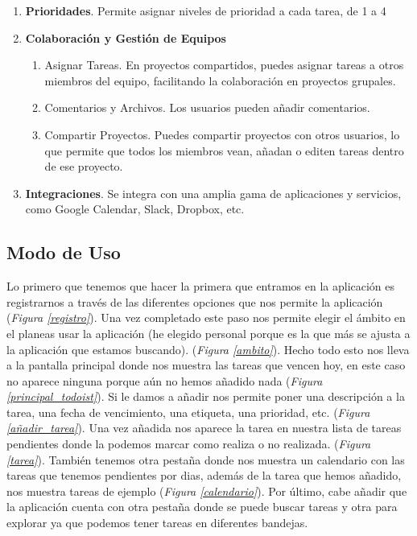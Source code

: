 \documentclass{article}
\begin{document}
\begin{enumerate}
\begin{enumerate}
        \item Filtros. Permite crear vistas personalizadas de las tareas, según criterios como fechas, etiquetas, etc.
    \end{enumerate}
    \item \textbf{Prioridades}. Permite asignar niveles de prioridad a cada tarea, de 1 a 4
    \item \textbf {Colaboración y Gestión de Equipos}
    \begin{enumerate}
        \item Asignar Tareas. En proyectos compartidos, puedes asignar tareas a otros miembros del equipo, facilitando la colaboración en proyectos grupales. 
        \item Comentarios y Archivos. Los usuarios pueden añadir comentarios.
        \item Compartir Proyectos. Puedes compartir proyectos con otros usuarios, lo que permite que todos los miembros vean, añadan o editen tareas dentro de ese proyecto.
    \end{enumerate}
    \item \textbf{Integraciones}. Se integra con una amplia gama de aplicaciones y servicios, como Google Calendar, Slack, Dropbox, etc.
\end{enumerate}

\subsection{Modo de Uso}
Lo primero que tenemos que hacer la primera que entramos en la aplicación es registrarnos a través de las diferentes opciones 
que nos permite la aplicación (\textit{Figura \ref{registro}}). Una vez completado este paso nos permite elegir 
el ámbito en el planeas usar la aplicación (he elegido personal porque es la que más se ajusta a la aplicación que estamos buscando).
(\textit{Figura \ref{ambito}}). Hecho todo esto nos lleva a la pantalla principal donde nos muestra las tareas que vencen hoy, en este caso
no aparece ninguna porque aún no hemos añadido nada (\textit{Figura \ref{principal_todoist}}). Si le damos a añadir nos permite poner
una descripción a la tarea, una fecha de vencimiento, una etiqueta, una prioridad, etc. (\textit{Figura \ref{añadir_tarea}}). Una vez añadida
nos aparece la tarea en nuestra lista de tareas pendientes donde la podemos marcar como realiza o no realizada. (\textit{Figura \ref{tarea}}).
También tenemos otra pestaña donde nos muestra un calendario con las tareas que tenemos pendientes por dias, además de la 
tarea que hemos añadido, nos muestra tareas de ejemplo (\textit{Figura \ref{calendario}}). Por último, cabe añadir que la aplicación cuenta
con otra pestaña donde se puede buscar tareas y otra para explorar ya que podemos tener tareas en diferentes bandejas.
\end{document}

